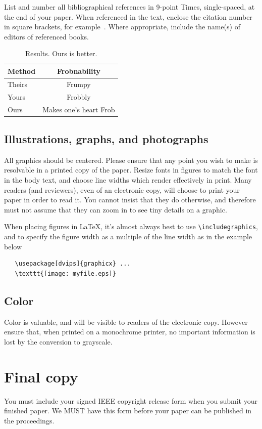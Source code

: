 \documentclass[10pt,twocolumn,letterpaper]{article}
\begin{document}
List and number all bibliographical references in 9-point Times,
single-spaced, at the end of your paper. When referenced in the text,
enclose the citation number in square brackets, for
example~\cite{Authors12}.  Where appropriate, include the name(s) of
editors of referenced books.

\begin{table}
\begin{center}
\begin{tabular}{|l|c|}
\hline
Method & Frobnability \\
\hline\hline
Theirs & Frumpy \\
Yours & Frobbly \\
Ours & Makes one's heart Frob\\
\hline
\end{tabular}
\end{center}
\caption{Results.   Ours is better.}
\end{table}

\subsection{Illustrations, graphs, and photographs}

All graphics should be centered.  Please ensure that any point you wish to
make is resolvable in a printed copy of the paper.  Resize fonts in figures
to match the font in the body text, and choose line widths which render
effectively in print.  Many readers (and reviewers), even of an electronic
copy, will choose to print your paper in order to read it.  You cannot
insist that they do otherwise, and therefore must not assume that they can
zoom in to see tiny details on a graphic.

When placing figures in \LaTeX, it's almost always best to use
\verb+\includegraphics+, and to specify the  figure width as a multiple of
the line width as in the example below
{\small\begin{verbatim}
   \usepackage[dvips]{graphicx} ...
   \texttt{[image: myfile.eps]}
\end{verbatim}
}


\subsection{Color}

Color is valuable, and will be visible to readers of the electronic copy.
However ensure that, when printed on a monochrome printer, no important
information is lost by the conversion to grayscale.

\section{Final copy}

You must include your signed IEEE copyright release form when you submit
your finished paper. We MUST have this form before your paper can be
published in the proceedings.
\end{document}
